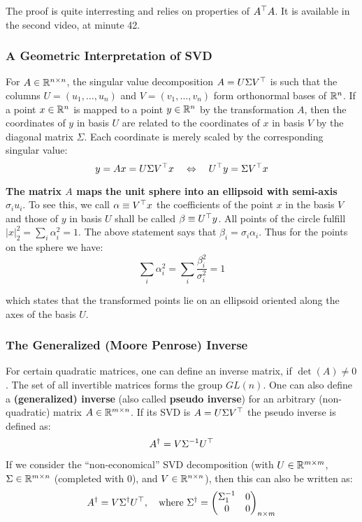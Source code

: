 The proof is quite interresting and relies on properties of $A^{\top}A$.
It is available in the second video, at minute 42.


\subsubsection{A Geometric Interpretation of SVD}%
\label{ssub:a_geometric_interpretation_of_svd}

For $A \in \mathbb{R}^{n \times{} n}$, the singular value decomposition
$A = U \Sigma V^{\top}$ is such that the columns $U = (u_1, \ldots, u_n)$
and $V = (v_1, \ldots, v_n)$ form orthonormal bases of $\mathbb{R}^n$.
If a point $x \in \mathbb{R}^n$ is mapped to a point $y \in \mathbb{R}^n$
by the transformation $A$, then the coordinates of $y$ in basis $U$
are related to the coordinates of $x$ in basis $V$
by the diagonal matrix $\Sigma$. Each coordinate is merely scaled by
the corresponding singular value:
\[y = Ax = U\Sigma V^{\top}x \quad \Leftrightarrow \quad U^{\top}y = \Sigma V^{\top}x\]

\textbf{The matrix $A$ maps the unit sphere into an ellipsoid with
semi-axis $\sigma_i u_i$}. To see this, we call $\alpha \equiv V^{\top}x$
the coefficients of the point $x$ in the basis $V$ and those of $y$
in basis $U$ shall be called $\beta \equiv U^{\top}y$.
All points of the circle fulfill $|x|^2_2 = \sum_i\alpha^2_i = 1$.
The above statement says that $\beta_i = \sigma_i\alpha_i$.
Thus for the points on the sphere we have:
	\[\sum_i\alpha^2_i = \sum_i\frac{\beta^2_i}{\sigma^2_i} = 1\]

which states that the transformed points lie on an ellipsoid
oriented along the axes of the basis $U$.


\subsubsection{The Generalized (Moore Penrose) Inverse}%
\label{ssub:the_generalized_moore_penrose_inverse}

For certain quadratic matrices, one can define an inverse matrix, if $\det(A) \ne 0$.
The set of all invertible matrices forms the group $GL(n)$.
One can also define a \textbf{(generalized) inverse}
(also called \textbf{pseudo inverse}) for an arbitrary (non-quadratic)
matrix $A \in \mathbb{R}^{m \times{} n}$. If its SVD is $A = U \Sigma V^{\top}$
the pseudo inverse is defined as:
	\[A^{\dagger} = V \Sigma^{-1} U^{\top}\]

If we consider the ``non-economical'' SVD decomposition
(with $U \in \mathbb{R}^{m \times{} m}$, $\Sigma \in \mathbb{R}^{m \times{} n}$ (completed with 0), and $V \in \mathbb{R}^{n \times{} n}$),
then this can also be written as:
	\[A^{\dagger} = V \Sigma^{\dagger} U^{\top}, \quad
		\text{where}\ \Sigma^{\dagger} =
		\begin{pmatrix}
			\Sigma_1^{-1} & 0 \\
			0 & 0
		\end{pmatrix}_{n \times m}\]

